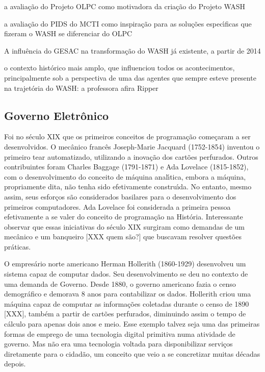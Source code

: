 \documentclass[
12pt,		%
openright,	%
twoside,  %
a4paper,			%
chapter=TITLE,		%
english,			%
french,				%
spanish,			%
brazil				%
]{USPSC-classe/USPSC_RedarTex}
\begin{document}
\begin{alineas}
\item a avalia\c{c}\~ao do Projeto OLPC como motivadora da cria\c{c}\~ao do Projeto WASH
\item a avalia\c{c}\~ao do PIDS do MCTI como inspira\c{c}\~ao para as solu\c{c}\~oes espec\'{\i}ficas que fizeram o WASH se diferenciar do OLPC
\item A influ\^encia do GESAC na transforma\c{c}\~ao do WASH j\'a existente, a partir de 2014
\item o contexto hist\'orico mais amplo, que influenciou todos os acontecimentos, principalmente sob a perspectiva de uma das agentes que sempre esteve presente na trajet\'oria do WASH: a professora afira Ripper
\end{alineas}

\subsection[Governo Eletr\^onico]{Governo Eletr\^onico}\label{Governo Eletr\^onico}
Foi no s\'eculo XIX que os primeiros conceitos de programa\c{c}\~ao come\c{c}aram a ser desenvolvidos. O mec\^anico franc\^es Joseph-Marie Jacquard (1752-1854) inventou o primeiro tear automatizado, utilizando a inova\c{c}\~ao dos cart\~oes perfurados. Outros contribuintes foram Charles Baggage (1791-1871) e Ada Lovelace (1815-1852), com o desenvolvimento do conceito de m\'aquina anal\'{\i}tica, embora a m\'aquina, propriamente dita, n\~ao tenha sido efetivamente constru\'{\i}da. No entanto, mesmo assim, seus esfor\c{c}os s\~ao considerados basilares para o desenvolvimento dos primeiros computadores. Ada Lovelace foi considerada a primeira pessoa efetivamente a se valer do conceito de programa\c{c}\~ao na Hist\'oria. Interessante observar que essas iniciativas do s\'eculo XIX surgiram como demandas de um mec\^anico e um banqueiro [XXX quem s\~ao?] que buscavam resolver quest\~oes pr\'aticas.








O empres\'ario norte americano Herman Hollerith (1860-1929) desenvolveu um sistema capaz de computar dados. Seu desenvolvimento se deu no contexto de uma demanda de Governo. Desde 1880, o governo americano fazia o censo demogr\'afico e demorava 8 anos para contabilizar os dados. Hollerith criou uma m\'aquina capaz de computar as informa\c{c}\~oes coletadas durante o censo de 1890 [XXX], tamb\'em a partir de cart\~oes perfurados, diminuindo assim o tempo de c\'alculo para apenas dois anos e meio. Esse exemplo talvez seja uma das primeiras formas de emprego de uma tecnologia digital primitiva numa atividade de governo. Mas n\~ao era uma tecnologia voltada para disponibilizar servi\c{c}os diretamente para o cidad\~ao, um conceito que veio a se concretizar muitas d\'ecadas depois.
\end{document}
